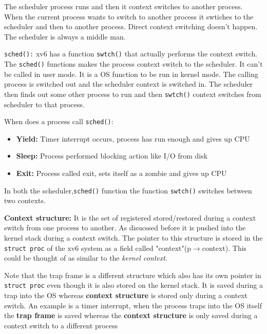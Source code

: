 \documentclass[12pt]{article}
\newcommand{\tbox}[1]{\noindent\fbox{\parbox{\textwidth}{#1}}}
\begin{document}
 The scheduler process runs and then it context switches to another process. When the current process wants to switch to another process it swtiches to the scheduler and then to another process. 
 Direct context switching doesn't happen. The scheduler is always a middle man.

{\texttt{sched():}}  xv6 has a function \texttt{swtch()} that actually performs the context switch. The \texttt{sched()} functions makes the process context switch to the scheduler. It can't be called in user mode. It
is a OS function to be run in kernel mode. The calling process is switched out and the scheduler context is switched in. The scheduler then finds out 
some other process to run and then \texttt{swtch()} context switches from scheduler to that process. 

When does a process call \texttt{sched()}:
\begin{itemize}[topsep=0pt, partopsep=0pt, itemsep=0pt, parsep=0pt]
    \item \textbf{Yield:} Timer interrupt occurs, process has run enough and gives up CPU
    \item \textbf{Sleep:} Process performed blocking action like I/O from disk
    \item \textbf{Exit:} Process called exit, sets itself as a zombie and gives up CPU
\end{itemize}

In both the scheduler,\texttt{sched()} function the function \texttt{swtch()} switches between two contexts.

\textbf{Context structure:} It is the set of registered stored/restored during a context switch from one process to another. As disucssed before it is pushed into the kernel stack during a context switch.
The pointer to this structure is stored in the \texttt{struct proc} of the xv6 system as a field called "context"(p$\rightarrow$context). This could be thought of as similar to the \textit{kernel context}.


Note that the trap frame is a different structure which also has its own pointer in \texttt{struct proc} even though it is also stored on the kernel stack. It is saved during a trap into the OS whereas \textbf{context structure}
is stored only during a context switch. An example is a timer interrupt, when the process traps into the OS itself the \textbf{trap frame} is saved whereas the \textbf{context structure} is only saved during a 
context switch to a different process

\newpage
\noindent\tbox{
    \begin{center}
    \textbf{\Huge Lecture 9}
    \end{center}
}
\\
\end{document}
